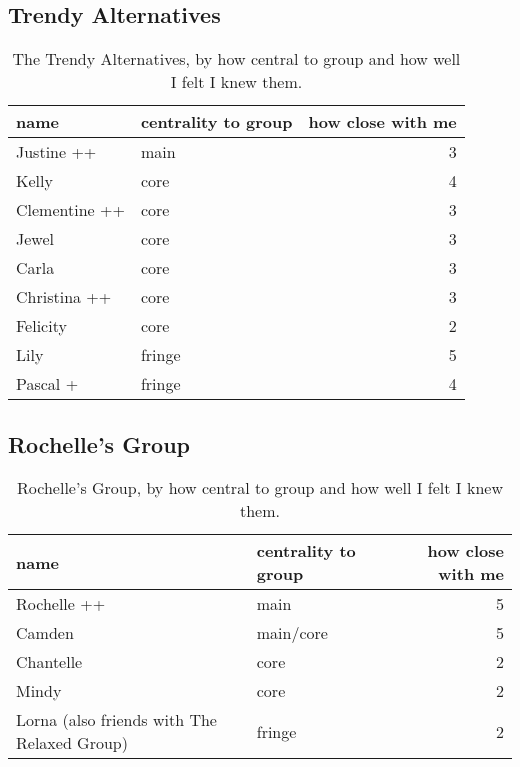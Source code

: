 \subsection{Trendy Alternatives}
\nopagebreak
\begin{table}[ht]
\caption{The Trendy Alternatives, by how central to group and how well I felt I knew them.}	\label{append:Alternatives}
	\centering
		\begin{tabular}{llr} \\
		\hline
					name & centrality to group & how close with me  \\
			\hline
Justine ++ & main & 3 \\
Kelly & core & 4 \\
Clementine ++ & core & 3 \\
Jewel  & core & 3 \\
Carla  & core & 3 \\
Christina ++ & core & 3 \\
Felicity & core & 2 \\
Lily  & fringe & 5 \\
Pascal +  & fringe & 4 \\

   \hline
		\end{tabular}
\end{table}

\subsection{Rochelle's Group}
\nopagebreak
\begin{table}[ht]
\caption{Rochelle's Group, by how central to group and how well I felt I knew them.}	\label{append:Drama}
	\centering
		\begin{tabular}{llr} \\
		\hline
							name & centrality to group & how close with me  \\
			\hline
		Rochelle ++ & main & 5 \\
		Camden   & main/core & 5 \\
		Chantelle & core & 2 \\
		Mindy     & core & 2 \\
		Lorna (also friends with The Relaxed Group)    & fringe & 2 \\
		   \hline
				\end{tabular}
\end{table}


\pagebreak
